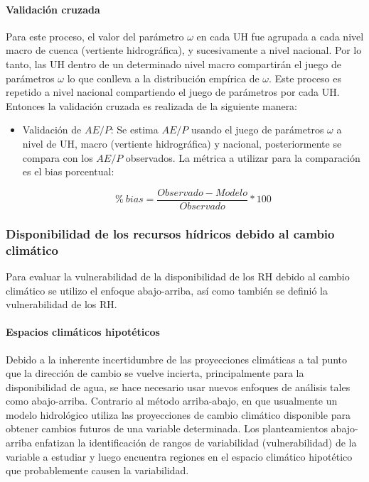 \documentclass[12pt]{article}
\begin{document}
\paragraph{Validación cruzada}\mbox{}

Para este proceso, el valor del parámetro $\omega$ en cada UH fue agrupada a cada nivel macro de cuenca (vertiente hidrográfica), y sucesivamente a nivel nacional. Por lo tanto, las UH dentro de un determinado nivel macro compartirán el juego de parámetros $\omega$ lo que conlleva a la distribución empírica de $\omega$. Este proceso es repetido a nivel nacional compartiendo el juego de parámetros por cada UH. Entonces la validación cruzada es realizada de la siguiente manera:

\begin{itemize}
  \item Validación de $AE/P$: Se estima $AE/P$ usando el juego de parámetros $\omega$ a nivel de UH, macro (vertiente hidrográfica) y nacional, posteriormente se compara con los $AE/P$ observados. La métrica a utilizar para la comparación es el bias porcentual:
  
    \begin{equation}
    \%\ bias = \frac{Observado-Modelo}{Observado}*100
    \end{equation}
\end{itemize}

\subsubsection{Disponibilidad de los recursos hídricos debido al cambio climático}

Para evaluar la vulnerabilidad de la disponibilidad de los RH debido al cambio climático se utilizo el enfoque abajo-arriba, así como también se definió la vulnerabilidad de los RH.

\paragraph{Espacios climáticos hipotéticos}\mbox{}

Debido a la inherente incertidumbre de las proyecciones climáticas a tal punto que la dirección de cambio se vuelve incierta, principalmente para la disponibilidad de agua, se hace necesario usar nuevos enfoques de análisis tales como abajo-arriba. Contrario al método arriba-abajo, en que usualmente un modelo hidrológico utiliza las proyecciones de cambio climático disponible para obtener cambios futuros de una variable determinada. Los planteamientos abajo-arriba enfatizan la identificación de rangos de variabilidad (vulnerabilidad) de la variable a estudiar y luego encuentra regiones en el espacio climático hipotético que probablemente causen la variabilidad.
\end{document}

